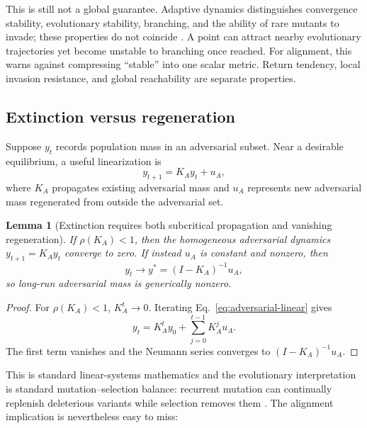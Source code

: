 \documentclass[11pt]{article}
\newtheorem{lemma}{Lemma}
\begin{document}
This is still not a global guarantee. Adaptive dynamics distinguishes convergence stability, evolutionary stability, branching, and the ability of rare mutants to invade; these properties do not coincide \parencite{geritz1998}. A point can attract nearby evolutionary trajectories yet become unstable to branching once reached. For alignment, this warns against compressing ``stable'' into one scalar metric. Return tendency, local invasion resistance, and global reachability are separate properties.

\subsection{Extinction versus regeneration}

Suppose $y_t$ records population mass in an adversarial subset. Near a desirable equilibrium, a useful linearization is
\begin{equation}
    y_{t+1}=K_Ay_t+u_A,
    \label{eq:adversarial-linear}
\end{equation}
where $K_A$ propagates existing adversarial mass and $u_A$ represents new adversarial mass regenerated from outside the adversarial set.

\begin{lemma}[Extinction requires both subcritical propagation and vanishing regeneration]
If $\rho(K_A)<1$, then the homogeneous adversarial dynamics $y_{t+1}=K_Ay_t$ converge to zero. If instead $u_A$ is constant and nonzero, then
\begin{equation}
    y_t\rightarrow y^*=(I-K_A)^{-1}u_A,
    \label{eq:mutation-selection-equilibrium}
\end{equation}
so long-run adversarial mass is generically nonzero.
\end{lemma}

\begin{proof}
For $\rho(K_A)<1$, $K_A^t\rightarrow 0$. Iterating Eq.~\eqref{eq:adversarial-linear} gives
\begin{equation}
    y_t=K_A^t y_0+\sum_{j=0}^{t-1}K_A^j u_A.
\end{equation}
The first term vanishes and the Neumann series converges to $(I-K_A)^{-1}u_A$.
\end{proof}

This is standard linear-systems mathematics and the evolutionary interpretation is standard mutation--selection balance: recurrent mutation can continually replenish deleterious variants while selection removes them \parencite{trotter2014,hermisson2002}. The alignment implication is nevertheless easy to miss:
\end{document}

